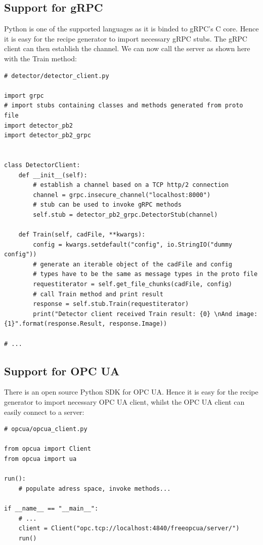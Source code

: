\subsection{Support for gRPC}
\label{sec:grpcpython}
Python is one of the supported languages as it is binded to gRPC's C core.  \cite{LastvisitedMay4th20192019GRPCDocumentation} Hence it is easy for the recipe generator to import necessary gRPC stubs. The gRPC client can then establish the channel. We can now call the server as shown here with the Train method:

\begin{verbatim}
# detector/detector_client.py

import grpc
# import stubs containing classes and methods generated from proto file
import detector_pb2
import detector_pb2_grpc


class DetectorClient:
    def __init__(self):
        # establish a channel based on a TCP http/2 connection
        channel = grpc.insecure_channel("localhost:8000")
        # stub can be used to invoke gRPC methods
        self.stub = detector_pb2_grpc.DetectorStub(channel)
    
    def Train(self, cadFile, **kwargs):
        config = kwargs.setdefault("config", io.StringIO("dummy config"))
        # generate an iterable object of the cadFile and config
        # types have to be the same as message types in the proto file
        requestiterator = self.get_file_chunks(cadFile, config)
        # call Train method and print result
        response = self.stub.Train(requestiterator)
        print("Detector client received Train result: {0} \nAnd image: {1}".format(response.Result, response.Image))
        
# ...
\end{verbatim}

\subsection{Support for OPC UA}
There is an open source Python SDK for OPC UA. \cite{LastvisitedMay4th2019OPCPython} Hence it is easy for the recipe generator to import necessary OPC UA client, whilst the OPC UA client can easily connect to a server:
\begin{verbatim}
# opcua/opcua_client.py

from opcua import Client
from opcua import ua

run():
    # populate adress space, invoke methods...

if __name__ == "__main__":
    # ...
    client = Client("opc.tcp://localhost:4840/freeopcua/server/")
    run()
\end{verbatim}

